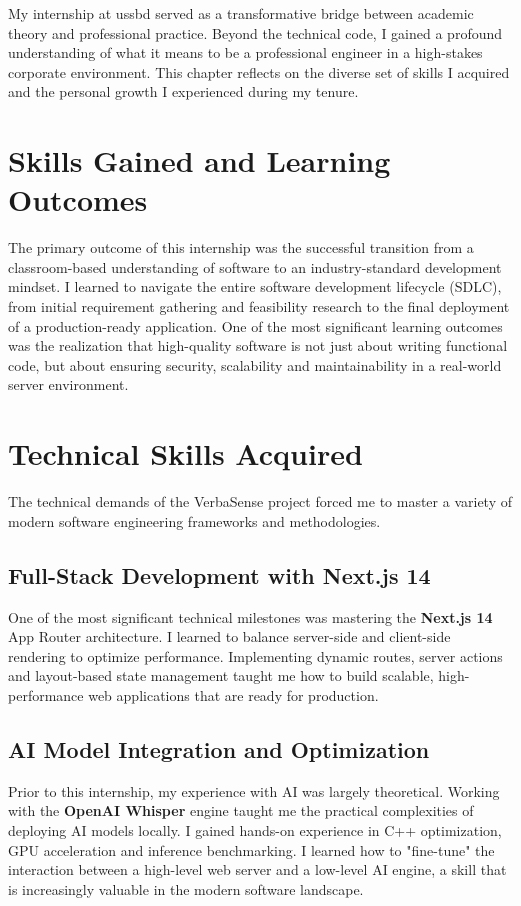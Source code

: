 \documentclass[oneside]{thesis-library}
\begin{document}
My internship at \Gls{ussbd} served as a transformative bridge between academic theory and professional practice. Beyond the technical code, I gained a profound understanding of what it means to be a professional engineer in a high-stakes corporate environment. This chapter reflects on the diverse set of skills I acquired and the personal growth I experienced during my tenure.

\section{Skills Gained and Learning Outcomes}
The primary outcome of this internship was the successful transition from a classroom-based understanding of software to an industry-standard development mindset. I learned to navigate the entire software development lifecycle (SDLC), from initial requirement gathering and feasibility research to the final deployment of a production-ready application. One of the most significant learning outcomes was the realization that high-quality software is not just about writing functional code, but about ensuring security, scalability and maintainability in a real-world server environment.

\section{Technical Skills Acquired}
The technical demands of the VerbaSense project forced me to master a variety of modern software engineering frameworks and methodologies.

\subsection{Full-Stack Development with Next.js 14}
One of the most significant technical milestones was mastering the \textbf{Next.js 14} App Router architecture. I learned to balance server-side and client-side rendering to optimize performance. Implementing dynamic routes, server actions and layout-based state management taught me how to build scalable, high-performance web applications that are ready for production.

\subsection{AI Model Integration and Optimization}
Prior to this internship, my experience with AI was largely theoretical. Working with the \textbf{OpenAI Whisper} engine taught me the practical complexities of deploying AI models locally. I gained hands-on experience in C++ optimization, GPU acceleration and inference benchmarking. I learned how to "fine-tune" the interaction between a high-level web server and a low-level AI engine, a skill that is increasingly valuable in the modern software landscape.
\end{document}
